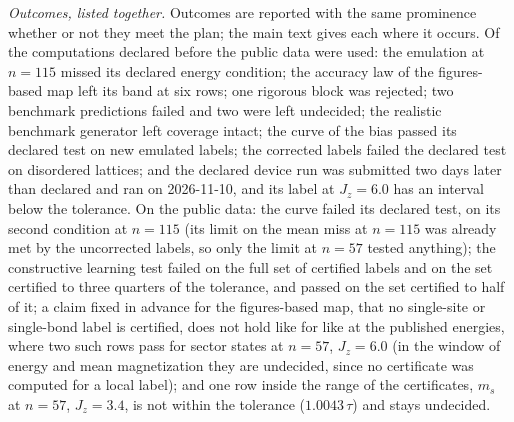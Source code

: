 \documentclass[aps,prx,onecolumn,10pt,nofootinbib,longbibliography,floatfix]{revtex4-2}
\theoremstyle{remark}
\newcommand{\Jz}{J_z}
\newcommand{\ms}{m_s}
\begin{document}
\emph{Outcomes, listed together.} Outcomes are reported with the same prominence whether or not they meet the plan;
the main text gives each where it occurs. Of the computations declared before the public data were used: the
emulation at $n=115$ missed its declared energy condition; the accuracy law of the figures-based map left its band %
at six rows; one rigorous block was rejected; two benchmark predictions failed and two were left undecided; the %
realistic benchmark generator left coverage intact; the curve of the bias passed its declared test on new emulated
labels; the corrected labels failed the declared test on disordered lattices; and the declared device run was submitted
two days later than declared and ran on 2026-11-10, and its label at $\Jz=6.0$ has an interval below the tolerance. On the public %
data: the curve failed its declared test, on its second condition at $n=115$ (its limit on the mean miss at %
$n=115$ was already met by the uncorrected labels, so only the limit at $n=57$ tested anything); the constructive %
learning test failed on the full set of certified labels and on the set certified to three quarters of the
tolerance, and passed on the set certified to half of it; a claim fixed in advance for the figures-based map, that
no single-site or single-bond label is certified, does not hold like for like at the published energies, where two
such rows pass for sector states at $n=57$, $\Jz=6.0$ (in the window of energy and mean magnetization they are %
undecided, since no certificate was computed for a local label); and one row inside the range of the certificates,
$\ms$ at $n=57$, $\Jz=3.4$, is not within the tolerance ($1.0043\,\tau$) and stays undecided. %
\end{document}
